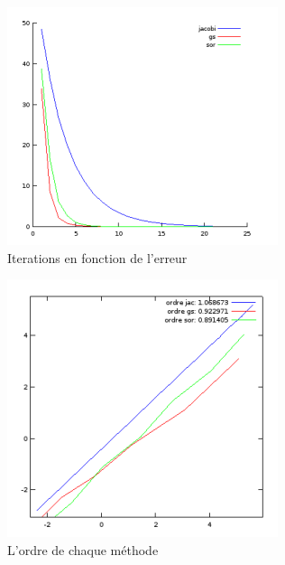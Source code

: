 \documentclass[a4paper,10pt]{article}
\begin{document}
\begin{figure}[th!]
    \centering
    \includegraphics{./img/iterative-its.png}
    \caption{Iterations en fonction de l'erreur}
    \label{fig:its}
\end{figure}

\begin{figure}[th!]
    \centering
    \includegraphics{./img/iterative-order.png}
    \caption{L'ordre de chaque méthode}
    \label{fig:order}
\end{figure}
\end{document}
